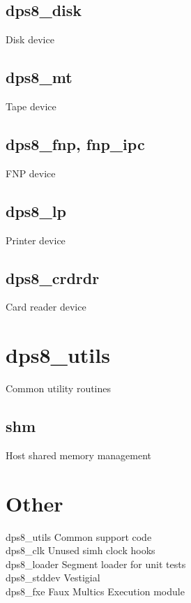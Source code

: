 \documentclass[notitlepage]{report}
\begin{document}
\subsection{dps8\_disk}

Disk device

\subsection{dps8\_mt}

Tape device

\subsection{dps8\_fnp, fnp\_ipc}

FNP device

\subsection{dps8\_lp}

Printer device

\subsection{dps8\_crdrdr}

Card reader device

\section{dps8\_utils}

Common utility routines

\subsection{shm}

Host shared memory management

\section{Other}

dps8\_utils Common support code \\
dps8\_clk  Unused simh clock hooks \\
dps8\_loader Segment loader for unit tests \\
dps8\_stddev Vestigial \\
dps8\_fxe Faux Multics Execution module

%
%
%
%
%
\end{document}
